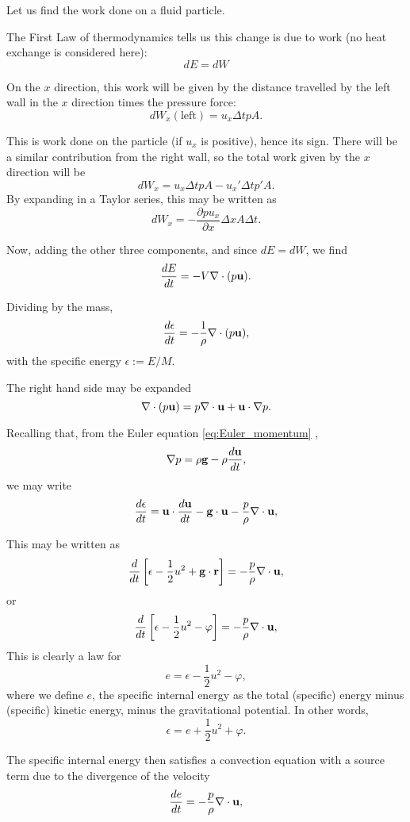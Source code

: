 Let us find the work done on a fluid particle.

The First Law of thermodynamics tells us this change is due
to work (no heat exchange is considered here):
\[
dE=dW
\]

On the $x$ direction, this work will be given by the distance
travelled by the left wall in the $x$ direction times the pressure
force:
\[
dW_x (\mathrm{left})  = u_x \Delta t p A .
\]

This is work done on the particle (if $u_x$ is positive), hence its
sign. There will be a similar contribution from the right wall, so the
total work given by the $x$ direction will be
\[
dW_x = u_x \Delta t p A  -  u_x'  \Delta t p' A .
\]
By expanding in a Taylor series, this may be written as
\[
dW_x = - \frac{\partial p u_x}{\partial x} \Delta x A \Delta t.
\]

Now, adding the other three components, and since $dE=dW$, we find
\[
\frac{dE}{dt} = - V \nabla\cdot (p\mathbf{u}) .
\]

Dividing by the mass,
\[
\frac{d \epsilon}{dt} = - \frac{1}{\rho} \nabla\cdot (p\mathbf{u}) ,
\]
with the specific energy $\epsilon:=E/M$.



The right hand side may be expanded
\[
\nabla\cdot (p\mathbf{u}) =
 p \nabla\cdot \mathbf{u} + 
 \mathbf{u} \cdot \nabla p .
\]

Recalling that, from the Euler equation \ref{eq:Euler_momentum} ,
\[
\nabla p  = \rho \mathbf{g} - \rho \frac{d \mathbf{u}}{dt} ,
\]
we may write
%
\begin{equation}
  \label{eq:specific_energy}
  \frac{d \epsilon}{dt} =
  \mathbf{u} \cdot \frac{d \mathbf{u}}{dt}  -
  \mathbf{g} \cdot  \mathbf{u} 
  -  \frac{p}{\rho} \nabla\cdot \mathbf{u} ,
\end{equation}

This may be written as
\[
\frac{d}{dt} \left[
  \epsilon - \frac12 u^2  + \mathbf{g} \cdot \mathbf{r}
  \right] = -  \frac{p}{\rho} \nabla\cdot \mathbf{u} ,
\]
or
\[
\frac{d}{dt} \left[
  \epsilon - \frac12 u^2  - \varphi
  \right] = -  \frac{p}{\rho} \nabla\cdot \mathbf{u} ,
\]
%
This is clearly a law for
\[
e = \epsilon - \frac12 u^2  - \varphi ,
\]
where we define $e$, the specific internal energy as the total (specific) energy
minus (specific) kinetic energy, minus the gravitational potential. In other words,
\[
\epsilon  = e  + \frac12 u^2  + \varphi .
\]

The specific internal energy then satisfies a convection equation with
a source term due to the divergence of the velocity
\begin{equation}
  \label{eq:Euler_energy}
  \frac{d e}{dt}  = -  \frac{p}{\rho} \nabla\cdot \mathbf{u} ,  
\end{equation}

